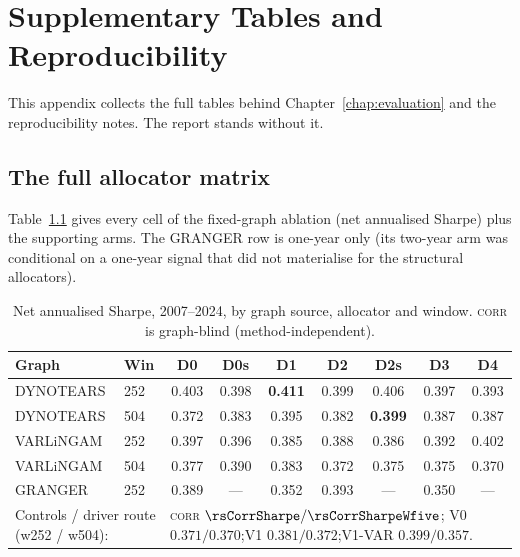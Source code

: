 \chapter{Supplementary Tables and Reproducibility}
\label{app:tables}

This appendix collects the full tables behind Chapter~\ref{chap:evaluation}
and the reproducibility notes. The report stands without it.

\section{The full allocator matrix}

Table~\ref{tab:matrix-full} gives every cell of the fixed-graph ablation
(net annualised Sharpe) plus the supporting arms. The GRANGER row is
one-year only (its two-year arm was conditional on a one-year signal that
did not materialise for the structural allocators).

\begin{table}[h]
  \centering
  \caption{Net annualised Sharpe, 2007--2024, by graph source, allocator and
    window. \textsc{corr} is graph-blind (method-independent).}
  \label{tab:matrix-full}
  \begin{tabular}{l l c c c c c c c}
    \toprule
    Graph & Win & D0 & D0s & D1 & D2 & D2s & D3 & D4 \\
    \midrule
    DYNOTEARS & 252 & 0.403 & 0.398 & \textbf{0.411} & 0.399 & 0.406 & 0.397 & 0.393 \\
    DYNOTEARS & 504 & 0.372 & 0.383 & 0.395 & 0.382 & \textbf{0.399} & 0.387 & 0.387 \\
    VARLiNGAM & 252 & 0.397 & 0.396 & 0.385 & 0.388 & 0.386 & 0.392 & 0.402 \\
    VARLiNGAM & 504 & 0.377 & 0.390 & 0.383 & 0.372 & 0.375 & 0.375 & 0.370 \\
    GRANGER   & 252 & 0.389 & --- & 0.352 & 0.393 & --- & 0.350 & --- \\
    \midrule
    \multicolumn{2}{l}{Controls / driver route (w252 / w504):} &
    \multicolumn{7}{l}{\textsc{corr} $\rsCorrSharpe/\rsCorrSharpeWfive$;\quad
      V0 $0.371/0.370$;\quad V1 $0.381/0.372$;\quad V1-VAR $0.399/0.357$.} \\
    \bottomrule
  \end{tabular}
\end{table}

